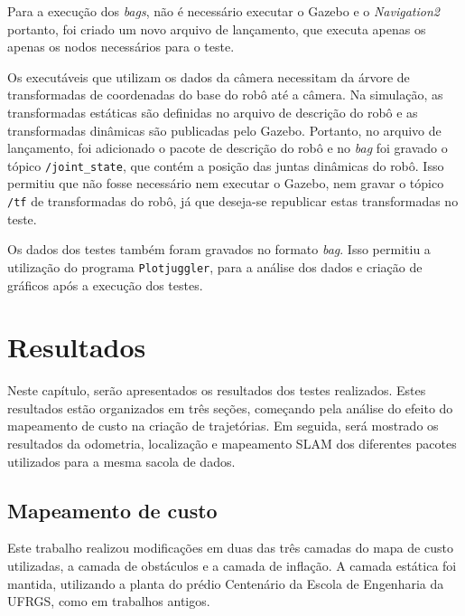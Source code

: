 \documentclass[repeatfields,xlists,xpacks,oneside,yearsonly]{ufrgscca}
\begin{document}



Para a execução dos \textit{bags}, não é necessário executar o Gazebo e o
\textit{Navigation2} portanto, foi criado um novo arquivo de lançamento,
que executa apenas os apenas os nodos necessários para o teste.

Os executáveis que utilizam os dados da câmera necessitam da árvore de
transformadas de coordenadas do base do robô até a câmera.
Na simulação, as transformadas estáticas são definidas no arquivo de descrição
do robô e as transformadas dinâmicas são publicadas pelo Gazebo.
Portanto, no arquivo de lançamento, foi adicionado o pacote
de descrição do robô e no \textit{bag} foi gravado o tópico
\texttt{/joint\_state}, que contém a posição das juntas dinâmicas do robô.
Isso permitiu que não fosse necessário nem executar o Gazebo, nem gravar
o tópico \texttt{/tf} de transformadas do robô, já que deseja-se republicar
estas transformadas no teste.

Os dados dos testes também foram gravados no formato \textit{bag}.
Isso permitiu a utilização do programa
\texttt{Plotjuggler}, para a análise
dos dados e criação de gráficos após a execução dos testes.

\chapter{Resultados}
\label{resultados}

Neste capítulo, serão apresentados os resultados dos testes realizados.
Estes resultados estão organizados em três seções, começando pela análise
do efeito do mapeamento de custo na criação de trajetórias.
Em seguida, será mostrado os resultados da odometria, localização e mapeamento
SLAM dos diferentes pacotes utilizados para a mesma sacola de dados.


\section{Mapeamento de custo}

Este trabalho realizou modificações em duas das três camadas do mapa de custo
utilizadas, a camada de obstáculos e a camada de inflação.
A camada estática foi mantida, utilizando a planta do prédio Centenário da
Escola de Engenharia da UFRGS, como em trabalhos antigos.
\end{document}
